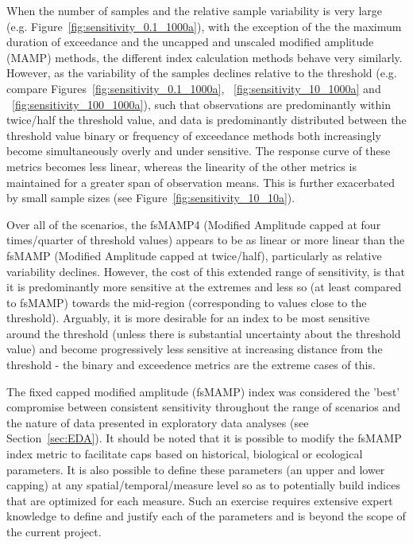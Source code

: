 When the number of samples and the relative sample variability is very large
(e.g. Figure~\ref{fig:sensitivity_0.1_1000a}), with the exception of the the maximum duration of
exceedance and the uncapped and unscaled modified amplitude (MAMP) methods, the different index
calculation methods behave very similarly.  However, as the variability of the samples declines
relative to the threshold (e.g. compare Figures~\ref{fig:sensitivity_0.1_1000a},
~\ref{fig:sensitivity_10_1000a} and ~\ref{fig:sensitivity_100_1000a}), such that observations are
predominantly within twice/half the threshold value, %
and data is predominantly distributed between the threshold value %
binary or frequency of exceedance methods both increasingly become simultaneously overly and under
sensitive.  The response curve of these metrics becomes less linear, whereas the linearity of the
other metrics is maintained for a greater span of observation means.  This is further exacerbated by
small sample sizes (see Figure~\ref{fig:sensitivity_10_10a}).

Over all of the scenarios, the fsMAMP4 (Modified Amplitude capped at four times/quarter of threshold
values) appears to be as linear or more linear than the fsMAMP (Modified Amplitude capped at
twice/half), particularly as relative variability declines.  However, the cost of this extended
range of sensitivity, is that it is predominantly more sensitive at the extremes and less so (at
least compared to fsMAMP) towards the mid-region (corresponding to values close to the threshold).
Arguably, it is more desirable for an index to be most sensitive around the threshold (unless there
is substantial uncertainty about the threshold value) and become progressively less sensitive at
increasing distance from the threshold - the binary and exceedence metrics are the extreme cases of
this.


The fixed capped modified amplitude (fsMAMP) index was considered the 'best' compromise between
consistent sensitivity throughout the range of scenarios and the nature of data presented in
exploratory data analyses (see Section~\ref{sec:EDA}).  It should be noted that it is possible to
modify the fsMAMP index metric to facilitate caps based on historical, biological or ecological
parameters.  It is also possible to define these parameters (an upper and lower capping) at any
spatial/temporal/measure level so as to potentially build indices that are optimized for each
measure.  Such an exercise requires extensive expert knowledge to define and justify each of the
parameters and is beyond the scope of the current project.


